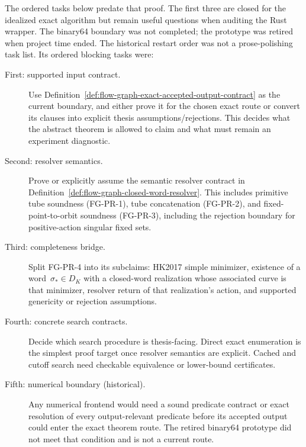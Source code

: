\begin{remark}\label{rem:fg-chapter-restart-order}
The ordered tasks below predate that proof. The first three are closed for the
idealized exact algorithm but remain useful questions when auditing the Rust
wrapper. The binary64 boundary was not completed; the prototype was retired
when project time ended.
The historical restart order was not a prose-polishing task list. Its ordered
blocking tasks were:
\begin{description}
  \item[First: supported input contract.]
    Use Definition~\ref{def:flow-graph-exact-accepted-output-contract} as the
    current boundary, and either prove it for the chosen exact route or convert
    its clauses into explicit thesis assumptions/rejections.  This decides what
    the abstract theorem is allowed to claim and what must remain an experiment
    diagnostic.
  \item[Second: resolver semantics.]
    Prove or explicitly assume the semantic resolver contract in
    Definition~\ref{def:flow-graph-closed-word-resolver}.  This includes
    primitive tube soundness (FG-PR-1), tube concatenation (FG-PR-2), and
    fixed-point-to-orbit soundness (FG-PR-3), including the rejection boundary
    for positive-action singular fixed sets.
  \item[Third: completeness bridge.]
    Split FG-PR-4 into its subclaims: HK2017 simple minimizer, existence of a
    word~$\sigma_*\in D_K$ with a closed-word realization whose associated
    curve is that minimizer, resolver return of that realization's action, and
    supported genericity or rejection assumptions.
  \item[Fourth: concrete search contracts.]
    Decide which search procedure is thesis-facing.  Direct exact enumeration
    is the simplest proof target once resolver semantics are explicit.  Cached
    and cutoff search need checkable equivalence or lower-bound certificates.
  \item[Fifth: numerical boundary (historical).]
    Any numerical frontend would need a sound predicate contract or exact
    resolution of every output-relevant predicate before its accepted output
    could enter the exact theorem route. The retired binary64 prototype did not
    meet that condition and is not a current route.
\end{description}
\end{remark}

